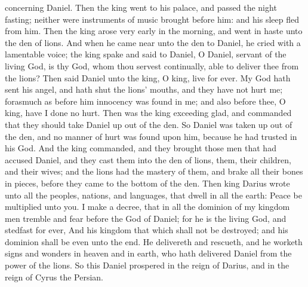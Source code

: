 concerning Daniel. Then the king went to his palace, and passed the night fasting; neither were instruments of music brought before him: and his sleep fled from him.  Then the king arose very early in the morning, and went in haste unto the den of lions. And when he came near unto the den to Daniel, he cried with a lamentable voice; the king spake and said to Daniel, O Daniel, servant of the living God, is thy God, whom thou servest continually, able to deliver thee from the lions? Then said Daniel unto the king, O king, live for ever. My God hath sent his angel, and hath shut the lions’ mouths, and they have not hurt me; forasmuch as before him innocency was found in me; and also before thee, O king, have I done no hurt. Then was the king exceeding glad, and commanded that they should take Daniel up out of the den. So Daniel was taken up out of the den, and no manner of hurt was found upon him, because he had trusted in his God.  And the king commanded, and they brought those men that had accused Daniel, and they cast them into the den of lions, them, their children, and their wives; and the lions had the mastery of them, and brake all their bones in pieces, before they came to the bottom of the den.  Then king Darius wrote unto all the peoples, nations, and languages, that dwell in all the earth: Peace be multiplied unto you. I make a decree, that in all the dominion of my kingdom men tremble and fear before the God of Daniel; for he is the living God, and stedfast for ever, And his kingdom that which shall not be destroyed; and his dominion shall be even unto the end. He delivereth and rescueth, and he worketh signs and wonders in heaven and in earth, who hath delivered Daniel from the power of the lions.  So this Daniel prospered in the reign of Darius, and in the reign of Cyrus the Persian. 

